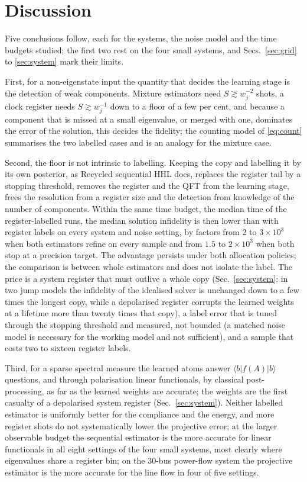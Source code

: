 \documentclass[journal]{IEEEtran}
\begin{document}
\section{Discussion}
\label{sec:disc}

Five conclusions follow, each for the systems, the noise model and the time budgets studied; the first two rest on the four small systems, and Secs.~\ref{sec:grid} to \ref{sec:system} mark their limits.

First, for a non-eigenstate input the quantity that decides the learning stage is the detection of weak components. Mixture estimators need $S\gtrsim w_j^{-2}$ shots, a clock register needs $S\gtrsim w_j^{-1}$ down to a floor of a few per cent, and because a component that is missed at a small eigenvalue, or merged with one, dominates the error of the solution, this decides the fidelity; the counting model of \eqref{eq:count} summarises the two labelled cases and is an analogy for the mixture case.

Second, the floor is not intrinsic to labelling. Keeping the copy and labelling it by its own posterior, as Recycled sequential HHL does, replaces the register tail by a stopping threshold, removes the register and the QFT from the learning stage, frees the resolution from a register size and the detection from knowledge of the number of components. Within the same time budget, the median time of the register-labelled runs, the median solution infidelity is then lower than with register labels on every system and noise setting, by factors from $2$ to $3\times10^3$ when both estimators refine on every sample and from $1.5$ to $2\times10^3$ when both stop at a precision target. The advantage persists under both allocation policies; the comparison is between whole estimators and does not isolate the label. The price is a system register that must outlive a whole copy (Sec.~\ref{sec:system}: in two jump models the infidelity of the idealised solver is unchanged down to a few times the longest copy, while a depolarised register corrupts the learned weights at a lifetime more than twenty times that copy), a label error that is tuned through the stopping threshold and measured, not bounded (a matched noise model is necessary for the working model and not sufficient), and a sample that costs two to sixteen register labels.

Third, for a sparse spectral measure the learned atoms answer $\langle b|f(A)|b\rangle$ questions, and through polarisation linear functionals, by classical post-processing, as far as the learned weights are accurate; the weights are the first casualty of a depolarised system register (Sec.~\ref{sec:system}). Neither labelled estimator is uniformly better for the compliance and the energy, and more register shots do not systematically lower the projective error; at the larger observable budget the sequential estimator is the more accurate for linear functionals in all eight settings of the four small systems, most clearly where eigenvalues share a register bin; on the 30-bus power-flow system the projective estimator is the more accurate for the line flow in four of five settings.
\end{document}
